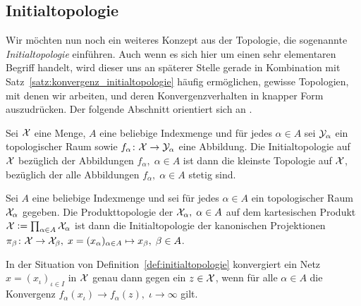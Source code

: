 \documentclass[../thesis/thesis.tex]{subfiles}
\begin{document}
	\subsection*{Initialtopologie}
	
	Wir möchten nun noch ein weiteres Konzept aus der Topologie, die sogenannte \emph{Initialtopologie} einführen.
	Auch wenn es sich hier um einen sehr elementaren Begriff handelt, wird dieser uns an späterer Stelle gerade 
	in Kombination mit Satz~\ref{satz:konvergenz_initialtopologie} häufig ermöglichen, 
	gewisse Topologien, mit denen wir arbeiten, und deren Konvergenzverhalten in knapper Form auszudrücken. 
	Der folgende Abschnitt orientiert sich an \cite[Kapitel 2.13]{Aliprantis.2006}.
	
	\begin{Definition}[Initialtopologie]
		\label{def:initialtopologie}
		Sei $\mathcal{X}$ eine Menge, $A$ eine beliebige Indexmenge und für jedes $\alpha \in A$ sei $\mathcal{Y}_\alpha$ ein topologischer Raum sowie $f_\alpha \colon \mathcal{X} \to \mathcal{Y}_\alpha$ eine Abbildung.
		Die Initialtopologie auf $\mathcal{X}$ bezüglich der Abbildungen $f_\alpha, \; \alpha \in A$ ist dann die kleinste Topologie auf $\mathcal{X}$, bezüglich der alle Abbildungen 
		$f_\alpha, \; \alpha \in A$ stetig sind.
	\end{Definition}

	\begin{Bemerkung}[Produkttopologie]
		Sei $A$ eine beliebige Indexmenge und sei für jedes $\alpha \in A$ ein topologischer Raum $\mathcal{X}_\alpha$ gegeben. Die Produkttopologie der $\mathcal{X}_\alpha, \; \alpha \in A$
		auf dem kartesischen Produkt $\mathcal{X} \vcentcolon = \prod_{\alpha \in A} \mathcal{X}_\alpha$ ist dann die Initialtopologie der kanonischen Projektionen 
		$\pi_\beta \colon \mathcal{X} \to \mathcal{X}_\beta, \; x = (x_\alpha)_{\alpha \in A} \mapsto x_\beta , \; \beta \in A$.
	\end{Bemerkung}
	
	\begin{Satz}
		\label{satz:konvergenz_initialtopologie}
		In der Situation von Definition~\ref{def:initialtopologie} konvergiert ein Netz $x = (x_\iota)_{\iota \in I}$ in $\mathcal{X}$ genau dann gegen ein $z \in \mathcal{X}$, wenn für alle $\alpha \in A$
		die Konvergenz $f_\alpha(x_\iota) \to f_\alpha(z), \; \iota \to \infty$ gilt.
	\end{Satz}
\end{document}

